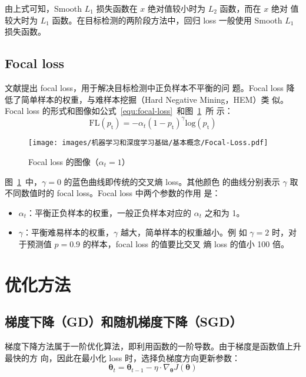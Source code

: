由上式可知，Smooth $L_1$ 损失函数在 $x$ 绝对值较小时为 $L_2$ 函数，而在 $x$ 绝对
值较大时为 $L_1$ 函数。在目标检测的两阶段方法中，回归 loss 一般使用 Smooth $L_1$
损失函数。

\subsection{Focal loss}

文献提出 focal loss，用于解决目标检测中正负样本不平衡的问
题。Focal loss 降低了简单样本的权重，与难样本挖掘（Hard Negative Mining，HEM）类
似。Focal loss 的形式和图像如公式~\ref{equ:focal-loss}~和图~\ref{fig:focal-loss}~所
示：
\begin{equation}
  \label{equ:focal-loss}
  \mathrm{FL}(p_{\mathrm{t}}) = - \alpha_t (1-p_{\mathrm{t}})^{\gamma} \mathrm{log}(p_{\mathrm{t}})
\end{equation}

\begin{figure}[ht]
  \centering
  \texttt{[image: images/机器学习和深度学习基础/基本概念/Focal-Loss.pdf]}
  \caption{Focal loss 的图像（$\alpha_t = 1$）}
  \label{fig:focal-loss}
\end{figure}

图~\ref{fig:focal-loss}~中，$\gamma = 0$ 的蓝色曲线即传统的交叉熵 loss。其他颜色
的曲线分别表示 $\gamma$ 取不同数值时的 focal loss。Focal loss 中两个参数的作用
是：

\begin{itemize}
  \item $\alpha_t$：平衡正负样本的权重，一般正负样本对应的 $\alpha_t$ 之和为 1。
  \item $\gamma$：平衡难易样本的权重，$\gamma$ 越大，简单样本的权重越小。例
    如 $\gamma = 2$ 时，对于预测值 $p = 0.9$ 的样本，focal loss 的值要比交叉
    熵 loss 的值小 100 倍。
\end{itemize}

\section{优化方法}
\label{sec:opt}

\subsection{梯度下降（GD）和随机梯度下降（SGD）}
梯度下降方法属于一阶优化算法，即利用函数的一阶导数。由于梯度是函数值上升最快的方
向，因此在最小化 loss 时，选择负梯度方向更新参数：
\begin{equation}
  \boldsymbol{\theta}_t = \boldsymbol{\theta}_{t-1} - \eta \cdot \nabla_{\boldsymbol{\theta}}J(\boldsymbol{\theta})
\end{equation}

